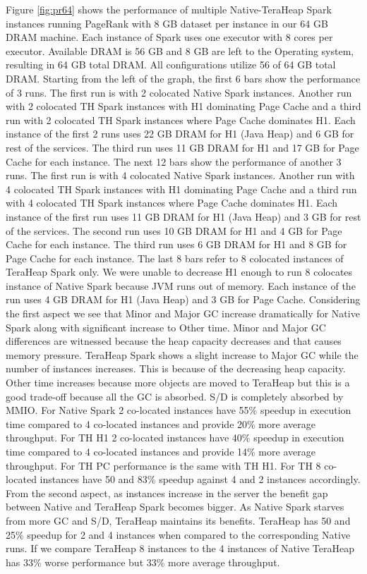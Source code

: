 Figure \ref{fig:pr64} shows the performance of multiple
Native-TeraHeap Spark instances running PageRank with 8 GB
dataset per instance in our 64 GB DRAM machine. Each instance of Spark
uses one executor with 8 cores per executor. Available DRAM is 56 GB
and 8 GB are left to the Operating system, resulting in 64 GB total
DRAM. All configurations utilize 56 of 64 GB total DRAM.
Starting from the left of the graph, the first 6 bars show the
performance of 3 runs. The first run is with 2 colocated Native Spark instances.
Another run with 2 colocated TH Spark instances with H1 dominating Page Cache
and a third run with 2 colocated TH Spark instances where Page Cache dominates H1.
Each instance of the first 2 runs uses 22 GB DRAM for H1 (Java Heap) and 6 GB for rest of the services.
The third run uses 11 GB DRAM for H1 and 17 GB for Page Cache for each instance. 
The next 12 bars show the performance of another 3 runs. The first run is with 4 colocated Native Spark instances.
Another run with 4 colocated TH Spark instances with H1 dominating Page Cache
and a third run with 4 colocated TH Spark instances where Page Cache dominates H1.
Each instance of the first run uses 11 GB DRAM for H1 (Java Heap) and 3 GB for rest of the services.
The second run uses 10 GB DRAM for H1 and 4 GB for Page Cache for each instance.
The third run uses 6 GB DRAM for H1 and 8 GB for Page Cache for each instance.
The last 8 bars refer to 8 colocated instances of TeraHeap Spark only. 
We were unable to decrease H1 enough to run 8 colocates instance of Native Spark
because JVM runs out of memory. Each instance of the run uses 4 GB DRAM for H1 (Java Heap) and 3 GB for Page Cache.
Considering the first aspect we see that Minor and Major GC increase dramatically for Native Spark along with significant increase to Other time. Minor and Major GC differences are witnessed because the heap capacity decreases and that causes memory pressure. TeraHeap Spark shows a slight increase to Major GC while the number of instances increases. This is because of the decreasing heap capacity. Other time increases because more objects are moved to TeraHeap but this is a good trade-off because all the GC is absorbed. S/D is completely absorbed by MMIO. 
For Native Spark 2 co-located instances have 55\% speedup in execution time compared to 4 co-located instances and provide 20\% more average throughput. For TH H1 2 co-located instances have 40\% speedup in execution time compared to 4 co-located instances and provide 14\% more average throughput. For TH PC performance is the same with TH H1. For TH 8 co-located instances have 50 and 83\% speedup against 4 and 2 instances accordingly.
From the second aspect, as instances increase in the server the benefit gap between Native and TeraHeap Spark becomes bigger. As Native Spark starves from more GC and S/D, TeraHeap maintains its benefits. TeraHeap has 50 and 25\% speedup for 2 and 4 instances when compared to the corresponding Native runs. If we compare TeraHeap 8 instances to the 4 instances of Native TeraHeap has 33\% worse performance but 33\% more average throughput.

